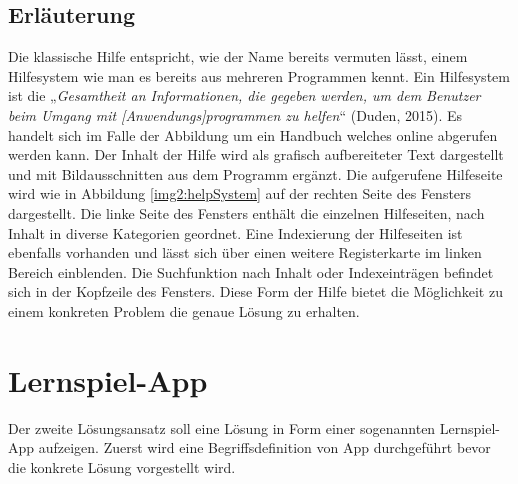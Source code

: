 \subsection{Erläuterung}
Die klassische Hilfe entspricht, wie der Name bereits vermuten lässt, einem Hilfesystem wie man es bereits aus mehreren Programmen kennt. Ein Hilfesystem ist die „\textit{Gesamtheit an Informationen, die gegeben werden, um dem Benutzer beim Umgang mit [Anwendungs]programmen zu helfen}“ (Duden, 2015). Es handelt sich im Falle der Abbildung um ein Handbuch welches online abgerufen werden kann. Der Inhalt der Hilfe wird als grafisch aufbereiteter Text dargestellt und mit Bildausschnitten aus dem Programm ergänzt. Die aufgerufene Hilfeseite wird wie in Abbildung \ref{img2:helpSystem} auf der rechten Seite des Fensters dargestellt. Die linke Seite des Fensters enthält die einzelnen Hilfeseiten, nach Inhalt in diverse Kategorien geordnet. Eine Indexierung der Hilfeseiten ist ebenfalls vorhanden und lässt sich über einen weitere Registerkarte im linken Bereich einblenden. Die Suchfunktion nach Inhalt oder Indexeinträgen befindet sich in der Kopfzeile des Fensters. Diese Form der Hilfe bietet die Möglichkeit zu einem konkreten Problem die genaue Lösung zu erhalten.

\section{Lernspiel-App}
Der zweite Lösungsansatz soll eine Lösung in Form einer sogenannten Lernspiel-App aufzeigen. Zuerst wird eine Begriffsdefinition von App durchgeführt bevor die konkrete Lösung vorgestellt wird.

